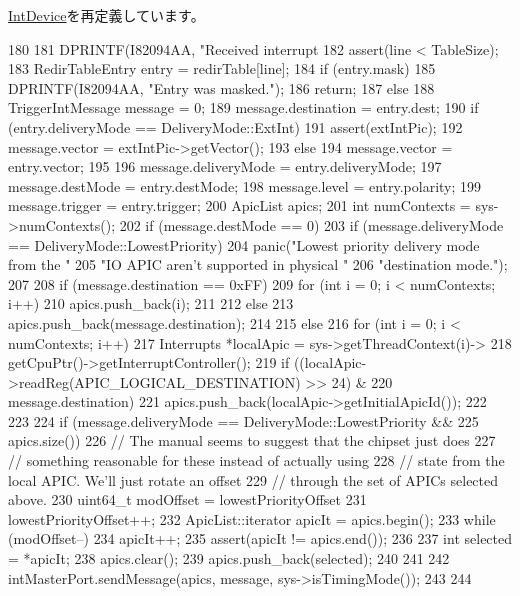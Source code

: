 \hyperlink{classX86ISA_1_1IntDevice_a10c7e7cffe2e50c6c515fa1d8f0a4460}{IntDevice}を再定義しています。


\begin{DoxyCode}
180 {
181     DPRINTF(I82094AA, "Received interrupt %
182     assert(line < TableSize);
183     RedirTableEntry entry = redirTable[line];
184     if (entry.mask) {
185         DPRINTF(I82094AA, "Entry was masked.\n");
186         return;
187     } else {
188         TriggerIntMessage message = 0;
189         message.destination = entry.dest;
190         if (entry.deliveryMode == DeliveryMode::ExtInt) {
191             assert(extIntPic);
192             message.vector = extIntPic->getVector();
193         } else {
194             message.vector = entry.vector;
195         }
196         message.deliveryMode = entry.deliveryMode;
197         message.destMode = entry.destMode;
198         message.level = entry.polarity;
199         message.trigger = entry.trigger;
200         ApicList apics;
201         int numContexts = sys->numContexts();
202         if (message.destMode == 0) {
203             if (message.deliveryMode == DeliveryMode::LowestPriority) {
204                 panic("Lowest priority delivery mode from the "
205                         "IO APIC aren't supported in physical "
206                         "destination mode.\n");
207             }
208             if (message.destination == 0xFF) {
209                 for (int i = 0; i < numContexts; i++) {
210                     apics.push_back(i);
211                 }
212             } else {
213                 apics.push_back(message.destination);
214             }
215         } else {
216             for (int i = 0; i < numContexts; i++) {
217                 Interrupts *localApic = sys->getThreadContext(i)->
218                     getCpuPtr()->getInterruptController();
219                 if ((localApic->readReg(APIC_LOGICAL_DESTINATION) >> 24) &
220                         message.destination) {
221                     apics.push_back(localApic->getInitialApicId());
222                 }
223             }
224             if (message.deliveryMode == DeliveryMode::LowestPriority &&
225                     apics.size()) {
226                 // The manual seems to suggest that the chipset just does
227                 // something reasonable for these instead of actually using
228                 // state from the local APIC. We'll just rotate an offset
229                 // through the set of APICs selected above.
230                 uint64_t modOffset = lowestPriorityOffset %
231                 lowestPriorityOffset++;
232                 ApicList::iterator apicIt = apics.begin();
233                 while (modOffset--) {
234                     apicIt++;
235                     assert(apicIt != apics.end());
236                 }
237                 int selected = *apicIt;
238                 apics.clear();
239                 apics.push_back(selected);
240             }
241         }
242         intMasterPort.sendMessage(apics, message, sys->isTimingMode());
243     }
244 }
\end{DoxyCode}
